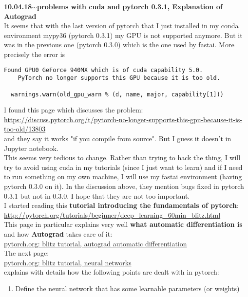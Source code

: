 \documentclass[11pt,a4paper]{article}
\newenvironment{loggentry}[2]%
{\noindent\textbf{#1}\hspace{1cm}$\mathbf{\sim}$\text{ }\textbf{#2}\\}{\vspace{0.5cm}}
\begin{document}
\begin{loggentry}{10.04.18}{problems with cuda and pytorch 0.3.1, Explanation of Autograd}
It seems that with the last version of pytorch that I just installed in my conda environment mypy36 (pytorch 0.3.1) my GPU is not supported anymore. But it was in the previous one (pytorch 0.3.0) which is the one used by fastai. More precisely the error is
\begin{verbatim}
Found GPU0 GeForce 940MX which is of cuda capability 5.0.
    PyTorch no longer supports this GPU because it is too old.
    
  warnings.warn(old_gpu_warn % (d, name, major, capability[1]))
\end{verbatim}
I found this page which discusses the problem:\\
\url{https://discuss.pytorch.org/t/pytorch-no-longer-supports-this-gpu-because-it-is-too-old/13803}\\
and they say it works "if you compile from source". But I guess it doesn't in Jupyter notebook.\\
This seems very tedious to change. Rather than trying to hack the thing, I will try to avoid using cuda in my tutorials (since I just want to learn) and if I need to run something on my own machine, I will use my fastai environment (having pytorch 0.3.0 on it). In the discussion above, they mention bugs fixed in pytorch 0.3.1 but not in 0.3.0. I hope that they are not too important.\\
I started reading this \textbf{tutorial introducing the fundamentals of pytorch}:\\
\url{http://pytorch.org/tutorials/beginner/deep_learning_60min_blitz.html}\\
This page in particular explains very well \textbf{what automatic differentiation is} and how \textbf{Autograd} takes care of it:\\
\href{http://pytorch.org/tutorials/beginner/blitz/autograd_tutorial.html}{pytorch.org: blitz tutorial, autograd automatic differentiation}\\
The next page:\\
\href{http://pytorch.org/tutorials/beginner/blitz/neural_networks_tutorial.html}{pytorch.org: blitz tutorial, neural networks}\\
explains with details how the following points are dealt with in pytorch:\\
\begin{enumerate}
\item Define the neural network that has some learnable parameters (or weights)

\end{enumerate}
\end{loggentry}
\end{document}
